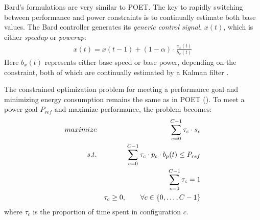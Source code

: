 Bard's formulations are very similar to POET.
The key to rapidly switching between performance and power constraints is to continually estimate both base values.
The Bard controller generates its \emph{generic control signal}, $x(t)$, which is either \emph{speedup} or \emph{powerup}:
\begin{eqnarray}
  x(t) = x(t-1) + (1-\alpha) \cdot \frac{e_x(t)}{b_x(t)}
  \label{eqn:bard-xup-control}
\end{eqnarray}
Here $b_x(t)$ represents either base speed or base power, depending on the constraint, both of which are continually estimated by a Kalman filter \cite{welch2006kalman}.

The constrained optimization problem for meeting a performance goal and minimizing energy consumption remains the same as in POET ().
To meet a power goal $P_{ref}$ and maximize performance, the problem becomes:
\begin{eqnarray}
  \maximize && \sum_{c=0}^{C-1} \tau_c \cdot s_c \label{eqn:bard-timing} \\
  \st %
  && \sum_{c=0}^{C-1} \tau_c \cdot p_c \cdot b_p(t) \le P_{ref} \label{eqn:bard-power} \\
  && \sum_{c=0}^{C-1} \tau_c = 1 \label{eqn:work} \\
  && \tau_c \ge 0, \qquad \forall c \in \{0,\ldots,C-1\} \label{eqn:bard-time}
\end{eqnarray}
where $\tau_c$ is the proportion of time spent in configuration $c$.

